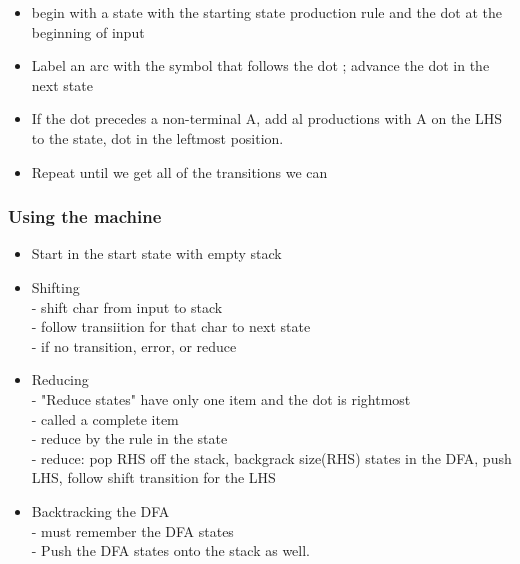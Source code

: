 \documentclass[12pt]{article}
\begin{document}
	\begin{itemize}
		\item begin with a state with the starting state production rule and the dot at the beginning of input
		\item Label an arc with the symbol that follows the dot ; advance the dot in the next state
		\item If the dot precedes a non-terminal A, add al productions with A on the LHS to the state, dot in the leftmost position.
		\item Repeat until we get all of the transitions we can
	\end{itemize}
	
	\subsubsection*{Using the machine}
	\begin{itemize}
		\item Start in the start state with empty stack
		\item Shifting \\
		- shift char from input to stack \\
		- follow transiition for that char to next state \\
		- if no transition, error, or reduce
		\item Reducing\\
		- "Reduce states" have only one item and the dot is rightmost\\
		- called a complete item\\
		- reduce by the rule in the state\\
		- reduce: pop RHS off the stack, backgrack size(RHS) states in the DFA, push LHS, follow shift transition for the LHS
		\item Backtracking the DFA\\
		- must remember the DFA states\\
		- Push the DFA states onto the stack as well.
	\end{itemize}
	
\end{document}
